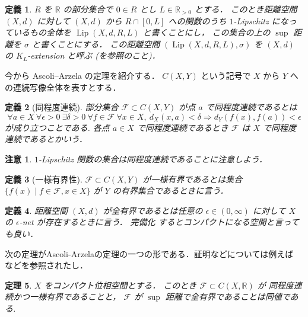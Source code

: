 \documentclass[leqno, 12pt]{jsarticle}
\newtheorem{thm}{定理}[section]
\newtheorem{df}[thm]{定義}
\newtheorem*{rmk}{注意}
\newcommand{\To}{\Longrightarrow}
\newcommand{\rr}{\mathbb{R}}
\DeclareMathOperator{\lip}{Lip}
\begin{document}
\begin{df}\label{df:func:Lip}
$R$
を
$\rr$
の部分集合で
$0\in R$
とし
$L\in \rr_{>0}$
とする．
このとき距離空間
$(X, d)$
に対して
$(X, d)$
から
$R\cap [0, L]$
への関数のうち
$1$-Lipschitz
になっているもの全体を
$\lip(X, d,  R, L)$
と書くことにし，
この集合の上の
$\sup$
距離を
$\sigma$
と書くことにする．
この距離空間
$(\lip(X, d, R, L), \sigma)$
を
$(X, d)$
の
$K_{L}$-extension
と呼ぶ 
(\cite{Greenbook}を参照のこと)．
\end{df}


今から
Ascoli--Arzela
の定理を紹介する．
$C(X, Y)$
という記号で
$X$
から
$Y$
への連続写像全体を表すとする．
\begin{df}[同程度連続]
部分集合
$\mathcal{F}\subset C(X,Y)$
が点
$a$
で同程度連続であるとは
\[
\forall a\in X\ \forall \epsilon>0\ \exists \delta>0\ \forall f\in \mathcal{F}\ \forall x\in X,\ d_{X}(x, a)<\delta\To  d_{Y}(f(x),f(a))<\epsilon 
\]
が成り立つことである.
各点
$a\in X$
で同程度連続であるとき
$\mathcal{F}$
は
$X$
で同程度連続であるとかいう．
\end{df}

\begin{rmk}
$1$-Lipschitz
関数の集合は同程度連続であることに注意しよう．
\end{rmk}


\begin{df}[一様有界性]
$\mathcal{F}\subset C(X,Y)$
が一様有界であるとは集合
$\{f(x)\mid f\in \mathcal{F}, x\in X\}$
が
$Y$
の有界集合であるときに言う．
\end{df}

\begin{df}
距離空間
$(X, d)$
が全有界であるとは任意の
$\epsilon\in (0, \infty)$
に対して
$X$の
$\epsilon$-net
が存在するときに言う．
完備化
するとコンパクトになる空間と言っても良い．
\end{df}

次の定理がAscoli-Arzelaの定理の一つの形である．証明などについては例えば
\cite{denpaAA}
などを参照されたし．
\begin{thm}\label{thm:func:aa}
$X$
をコンパクト位相空間とする．
このとき
$\mathcal{F}\subset C(X, \rr)$
が
同程度連続かつ一様有界であることと，
$\mathcal{F}$
が
$\sup$
距離で全有界であることは同値である.
\end{thm}
\end{document}
